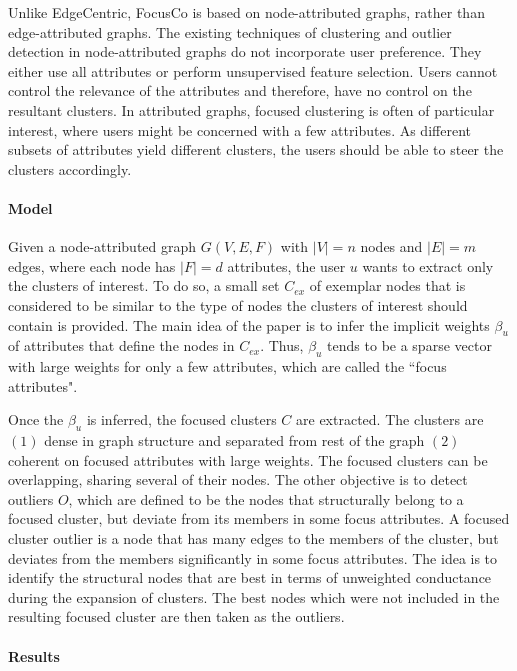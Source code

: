 \documentclass[11pt, oneside]{article}   	%
\begin{document}
\quad Unlike EdgeCentric, FocusCo \cite{focusco} is based on node-attributed graphs, rather than edge-attributed graphs.
The existing techniques of clustering and outlier detection in node-attributed graphs do not incorporate user preference.
They either use all attributes or perform unsupervised feature selection.
Users cannot control the relevance of the attributes and therefore, have no control on the resultant clusters.
In attributed graphs, focused clustering is often of particular interest, where users might be concerned with a few attributes. 
As different subsets of attributes yield different clusters, the users should be able to steer the clusters accordingly.

\paragraph{Model}
\quad

\quad Given a node-attributed graph $G(V,E,F)$ with $|V|=n$ nodes and $|E|=m$ edges, where each node has $|F| = d$ attributes, the user $u$ wants to extract only the clusters of interest.
To do so, a small set $C_{ex}$ of exemplar nodes that is considered to be similar to the type of nodes the clusters of interest should contain is provided.
The main idea of the paper is to infer the implicit weights $\beta_{u}$ of attributes that define the nodes in $C_{ex}$.
Thus, $\beta_u$ tends to be a sparse vector with large weights for only a few attributes, which are called the ``focus attributes".

\quad Once the $\beta_u$ is inferred, the focused clusters $C$ are extracted. 
The clusters are $(1)$ dense in graph structure and separated from rest of the graph $(2)$ coherent on focused attributes with large weights.
The focused clusters can be overlapping, sharing several of their nodes.
The other objective is to detect outliers $O$, which are defined to be the nodes that structurally belong to a focused cluster, but deviate from its members in some focus attributes. A focused cluster outlier is a node that has many edges to the members of the cluster, but deviates from the members significantly in some focus attributes.
The idea is to identify the structural nodes that are best in terms of unweighted conductance during the expansion of clusters.
The best nodes which were not included in the resulting focused cluster are then taken as the outliers.


\paragraph{Results}
\quad
\end{document}
